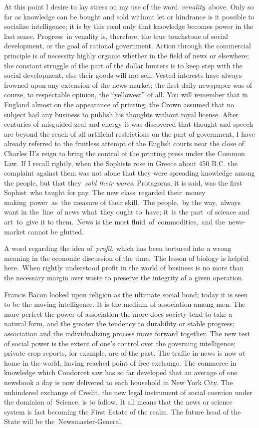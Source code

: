\documentclass[openany,nobib]{tufte-book}
\begin{document}
At this point I desire to lay stress on my use of the
word~\emph{venality}~above. Only so far as knowledge can be bought and
sold without let or hindrance is it possible to socialize intelligence;
it is by this road only that knowledge becomes power in the last sense.
Progress~in venality is, therefore, the true touchstone of social
development, or the goal of rational government. Action through the
commercial principle is of necessity highly organic whether in the field
of news or elsewhere; the constant struggle of the part of the dollar
hunters is to keep step with the social development, else their goods
will not sell. Vested interests have always frowned upon any extension
of the news-market; the first daily newspaper was of course, to
respectable opinion, the ``yellowest'' of all. You will remember that in
England almost on the appearance of printing, the Crown assumed that no
subject had any business to publish his thoughts without royal license.
After centuries of misguided zeal and energy it was discovered that
thought and speech are beyond the reach of all artificial restrictions
on the part of government, I have already referred to the fruitless
attempt of the English courts near the close of Charles II's reign to
bring the control of the printing press under the Common Law. If I
recall rightly, when the Sophists rose in Greece about 450 B.C. the
complaint against them was not alone that they were spreading knowledge
among the people, but that they~\emph{sold their wares}. Protagoras, it
is said, was the first Sophist~who taught for pay. The new
class~regarded their~money making~power~as~the measure of their
skill.~The people,~by the way,~always want in the~line~of news what~they
ought to~have; it~is the part~of science and art~to~give it to
them.~News is the most fluid~of~commodities,~and the~news-market cannot
be glutted.~

A word regarding the idea of~\emph{profit}, which has been tortured into
a wrong meaning in the economic discussion of the time.~The lesson of
biology is helpful here.~When rightly understood profit in the world of
business is no more than the necessary margin over waste to preserve the
integrity of a given operation.~

\newpage Francis Bacon looked upon religion as the ultimate social bond; today it
is seen to be the moving intelligence. It is the medium of association
among men. The more perfect the power of association the more does
society tend to take a natural form, and the greater the tendency to
durability or stable progress; association and the individualizing
process move forward together. The new test of social power is the
extent of one's control over the governing intelligence; private crop
reports, for example, are of the past. The traffic in news is now at
home in the world, having reached point of free exchange. The commerce
in knowledge which Condorcet saw has so far developed that an average of
one newsbook a day is now delivered to each household in New York City.
The unhindered exchange of Credit, the new legal instrument of social
coercion under the dominion of~Science, is to follow. It all means that
the news or science system is fast becoming the First Estate of the
realm. The future head of the State will be the~Newsmaster-General.~
\end{document}
